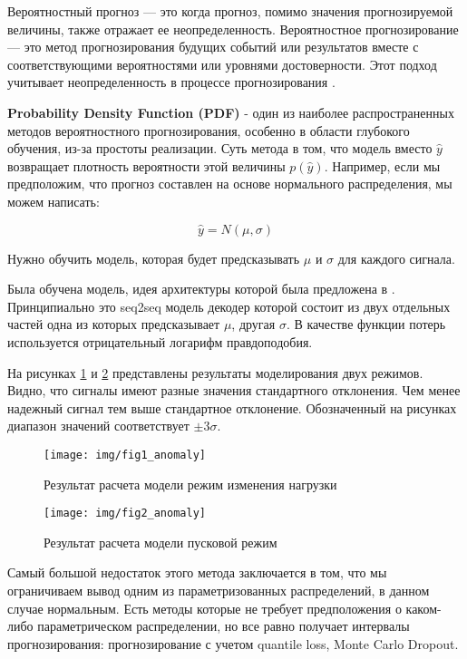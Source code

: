 \documentclass[12pt,a4paper]{article}
\begin{document}
Вероятностный прогноз — это когда прогноз, помимо значения прогнозируемой величины, также отражает ее неопределенность. Вероятностное прогнозирование — это метод прогнозирования будущих событий или результатов вместе с соответствующими вероятностями или уровнями достоверности. Этот подход учитывает неопределенность в процессе прогнозирования \cite{joseph_tackes}.

\textbf{Probability Density Function (PDF)} - один из наиболее распространенных методов вероятностного прогнозирования, особенно в области глубокого обучения, из-за простоты реализации. Суть метода в том, что модель вместо $\hat{y}$ возвращает плотность вероятности этой величины $p(\hat{y})$. Например, если мы предположим, что прогноз составлен на основе нормального распределения, мы можем написать:

$$\hat{y} = N(\mu, \sigma)$$

Нужно обучить модель, которая будет предсказывать $\mu$ и $\sigma$ для каждого сигнала.

Была обучена модель, идея архитектуры которой была предложена в \cite{wang_smola}. Принципиально это seq2seq модель декодер которой состоит из двух отдельных частей одна из которых предсказывает $\mu$, другая $\sigma$. В качестве функции потерь используется отрицательный логарифм правдоподобия.
 
 На рисунках \ref{fig:fig1_anomaly} и \ref{fig:fig2_anomaly} представлены результаты моделирования двух режимов. Видно, что сигналы имеют разные значения стандартного отклонения.  Чем менее надежный сигнал тем выше стандартное отклонение. Обозначенный на рисунках диапазон значений соответствует $\pm3\sigma$.
 
 \begin{figure}[htbp]
 	\centering\texttt{[image: img/fig1\_anomaly]}
 	\caption{Результат расчета модели режим изменения нагрузки}
 	\label{fig:fig1_anomaly}
 \end{figure}
 
 \begin{figure}[htbp]
 	\centering\texttt{[image: img/fig2\_anomaly]}
 	\caption{Результат расчета модели пусковой режим}
 	\label{fig:fig2_anomaly}
 \end{figure}
 
 Самый большой недостаток этого метода заключается в том, что мы ограничиваем вывод одним из параметризованных распределений, в данном случае нормальным. Есть методы которые не требует предположения о каком-либо параметрическом распределении, но все равно получает интервалы прогнозирования: прогнозирование с учетом quantile loss, Monte Carlo Dropout.
 
\end{document}
